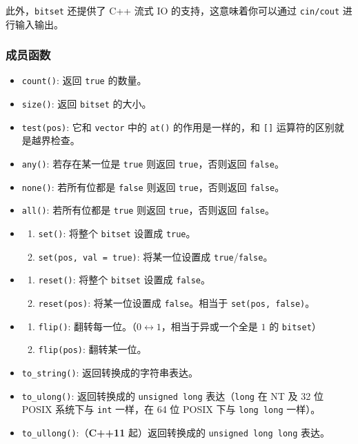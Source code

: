 此外，\texttt{bitset} 还提供了 C++ 流式 IO 的支持，这意味着你可以通过 \texttt{cin/cout} 进行输入输出。

\subsubsection{成员函数}\label{ux6210ux5458ux51fdux6570-4}

\begin{itemize}
\tightlist
\item
  \texttt{count()}: 返回 \texttt{true} 的数量。
\item
  \texttt{size()}: 返回 \texttt{bitset} 的大小。
\item
  \texttt{test(pos)}: 它和 \texttt{vector} 中的 \texttt{at()} 的作用是一样的，和 \texttt{{[}{]}} 运算符的区别就是越界检查。
\item
  \texttt{any()}: 若存在某一位是 \texttt{true} 则返回 \texttt{true}，否则返回 \texttt{false}。
\item
  \texttt{none()}: 若所有位都是 \texttt{false} 则返回 \texttt{true}，否则返回 \texttt{false}。
\item
  \texttt{all()}: 若所有位都是 \texttt{true} 则返回 \texttt{true}，否则返回 \texttt{false}。
\item
  \begin{enumerate}
  \def\labelenumi{\arabic{enumi}.}
  \tightlist
  \item
    \texttt{set()}: 将整个 \texttt{bitset} 设置成 \texttt{true}。
  \item
    \texttt{set(pos,\ val\ =\ true)}: 将某一位设置成 \texttt{true}/\texttt{false}。
  \end{enumerate}
\item
  \begin{enumerate}
  \def\labelenumi{\arabic{enumi}.}
  \tightlist
  \item
    \texttt{reset()}: 将整个 \texttt{bitset} 设置成 \texttt{false}。
  \item
    \texttt{reset(pos)}: 将某一位设置成 \texttt{false}。相当于 \texttt{set(pos,\ false)}。
  \end{enumerate}
\item
  \begin{enumerate}
  \def\labelenumi{\arabic{enumi}.}
  \tightlist
  \item
    \texttt{flip()}: 翻转每一位。（\(0\leftrightarrow1\)，相当于异或一个全是 \(1\) 的 \texttt{bitset}）
  \item
    \texttt{flip(pos)}: 翻转某一位。
  \end{enumerate}
\item
  \texttt{to\_string()}: 返回转换成的字符串表达。
\item
  \texttt{to\_ulong()}: 返回转换成的 \texttt{unsigned\ long} 表达（\texttt{long} 在 NT 及 32 位 POSIX 系统下与 \texttt{int} 一样，在 64 位 POSIX 下与 \texttt{long\ long} 一样）。
\item
  \texttt{to\_ullong()}:（\textbf{C++11} 起）返回转换成的 \texttt{unsigned\ long\ long} 表达。
\end{itemize}

